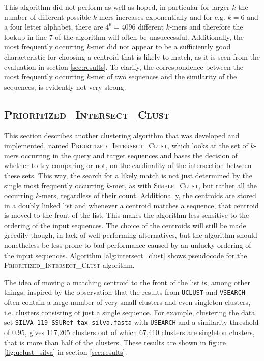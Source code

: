 This algorithm did not perform as well as hoped, in particular for larger $k$
the number of different possible $k$-mers increases exponentially and for e.g.
$k = 6$ and a four letter alphabet, there are $4^6 = 4096$ different $k$-mers
and therefore the lookup in line 7 of the algorithm will often be unsuccessful.
Additionally, the most frequently occurring $k$-mer did not appear to be a
sufficiently good characteristic for choosing a centroid that is likely to
match, as it is seen from the evaluation in section \ref{sec:results}. To
clarify, the correspondence between the most frequently occurring $k$-mer of
two sequences and the similarity of the sequences, is evidently not very strong.


\subsection{\textsc{Prioritized\_Intersect\_Clust}}

This section describes another clustering algorithm that was developed and
implemented, named \textsc{Prioritized\_Intersect\_Clust}, which looks at the
set of $k$-mers occurring in the query and target sequences and bases the
decision of whether to try comparing or not, on the cardinality of the
intersection between these sets. This way, the search for a likely match is not
just determined by the single most frequently occurring $k$-mer, as with
\textsc{Simple\_Clust}, but rather all the occurring $k$-mers, regardless of
their count. Additionally, the centroids are stored in a doubly linked list and
whenever a centroid matches a sequence, that centroid is moved to the front of
the list. This makes the algorithm less sensitive to the ordering of the input
sequences. The choice of the centroids will still be made greedily though, in
lack of well-performing alternatives, but the algorithm should nonetheless be
less prone to bad performance caused by an unlucky ordering of the input
sequences. Algorithm \ref{alg:intersect_clust} shows pseudocode for the
\textsc{Prioritized\_Intersect\_Clust} algorithm.

The idea of moving a matching centroid to the front of the list is, among other
things, inspired by the observation that the results from \texttt{UCLUST} and
\texttt{VSEARCH} often contain a large number of very small clusters and even
singleton clusters, i.e. clusters consisting of just a single sequence. For
example, clustering the data set \texttt{SILVA\_119\_SSURef\_tax\_silva.fasta}
with \texttt{USEARCH} and a similarity threshold of $0.95$, gives 117,205
clusters out of which 67,410 clusters are singleton clusters, that is more than
half of the clusters. These results are shown in figure \ref{fig:uclust_silva}
in section \ref{sec:results}.

